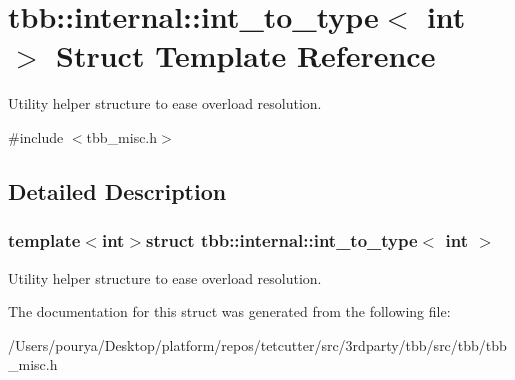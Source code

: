 \hypertarget{structtbb_1_1internal_1_1int__to__type}{}\section{tbb\+:\+:internal\+:\+:int\+\_\+to\+\_\+type$<$ int $>$ Struct Template Reference}
\label{structtbb_1_1internal_1_1int__to__type}


Utility helper structure to ease overload resolution.  




{\ttfamily \#include $<$tbb\+\_\+misc.\+h$>$}



\subsection{Detailed Description}
\subsubsection*{template$<$int$>$struct tbb\+::internal\+::int\+\_\+to\+\_\+type$<$ int $>$}

Utility helper structure to ease overload resolution. 

The documentation for this struct was generated from the following file\+:\begin{DoxyCompactItemize}
\item 
/\+Users/pourya/\+Desktop/platform/repos/tetcutter/src/3rdparty/tbb/src/tbb/tbb\+\_\+misc.\+h\end{DoxyCompactItemize}
